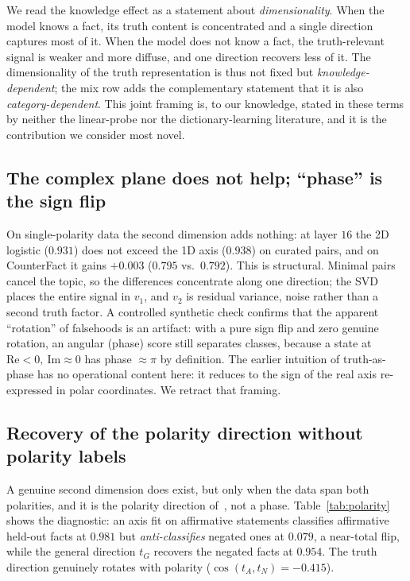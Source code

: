 \documentclass[11pt]{article}
\begin{document}
We read the knowledge effect as a statement about \emph{dimensionality}. When
the model knows a fact, its truth content is concentrated and a single
direction captures most of it. When the model does not know a fact, the
truth-relevant signal is weaker and more diffuse, and one direction recovers
less of it. The dimensionality of the truth representation is thus not fixed
but \emph{knowledge-dependent}; the mix row adds the complementary statement
that it is also \emph{category-dependent}. This joint framing is, to our
knowledge, stated in these terms by neither the linear-probe nor the
dictionary-learning literature, and it is the contribution we consider most
novel.

\subsection{The complex plane does not help; ``phase'' is the sign flip}
\label{sec:phase}

On single-polarity data the second dimension adds nothing: at layer $16$ the
2D logistic ($0.931$) does not exceed the 1D axis ($0.938$) on curated pairs,
and on CounterFact it gains $+0.003$ ($0.795$ vs.\ $0.792$). This is
structural. Minimal pairs cancel the topic, so the differences concentrate
along one direction; the SVD places the entire signal in $v_1$, and $v_2$ is
residual variance, noise rather than a second truth factor. A controlled
synthetic check confirms that the apparent ``rotation'' of falsehoods is an
artifact: with a pure sign flip and zero genuine rotation, an angular (phase)
score still separates classes, because a state at $\mathrm{Re} < 0,\
\mathrm{Im} \approx 0$ has phase $\approx \pi$ by definition. The earlier
intuition of truth-as-phase has no operational content here: it reduces to
the sign of the real axis re-expressed in polar coordinates. We retract that
framing.

\subsection{Recovery of the polarity direction without polarity labels}
\label{sec:polarity}

A genuine second dimension does exist, but only when the data span both
polarities, and it is the polarity direction of~\cite{burger2024}, not a
phase. Table~\ref{tab:polarity} shows the diagnostic: an axis fit on
affirmative statements classifies affirmative held-out facts at $0.981$ but
\emph{anti-classifies} negated ones at $0.079$, a near-total flip, while the
general direction $t_G$ recovers the negated facts at $0.954$. The truth
direction genuinely rotates with polarity ($\cos(t_A, t_N) = -0.415$).
\end{document}
